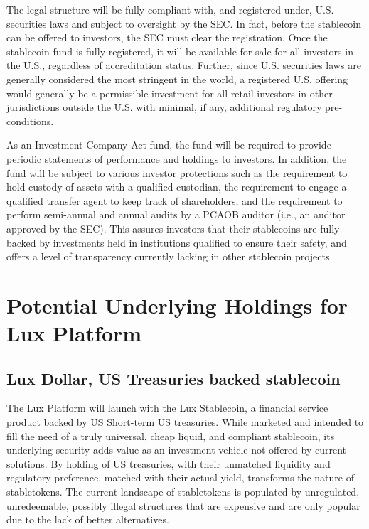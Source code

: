 \documentclass[11pt]{article}
\begin{document}
The legal structure will be fully compliant with, and registered under, U.S. securities laws and subject to oversight by the SEC.  In fact, before the stablecoin can be offered to investors, the SEC must clear the registration.  Once the stablecoin fund is fully registered, it will be available for sale for all investors in the U.S., regardless of accreditation status.  Further, since U.S. securities laws are generally considered the most stringent in the world, a registered U.S. offering would generally be a permissible investment for all retail investors in other jurisdictions outside the U.S. with minimal, if any, additional regulatory pre-conditions.


As an Investment Company Act fund, the fund will be required to provide periodic statements of performance and holdings to investors.  In addition, the fund will be subject to various investor protections such as the requirement to hold custody of assets with a qualified custodian, the requirement to engage a qualified transfer agent to keep track of shareholders, and the requirement to perform semi-annual and annual audits by a PCAOB auditor (i.e., an auditor approved by the SEC).  This assures investors that their stablecoins are fully-backed by investments held in institutions qualified to ensure their safety, and offers a level of transparency currently lacking in other stablecoin projects.


\section{Potential Underlying Holdings for Lux Platform}

\subsection{Lux Dollar, US Treasuries backed stablecoin}

The Lux Platform will launch with the Lux Stablecoin, a financial service product backed by US Short-term US treasuries. While marketed and intended to fill the need of a truly universal, cheap liquid, and compliant stablecoin, its underlying security adds value as an investment vehicle not offered by current solutions. By holding of US treasuries, with their unmatched liquidity and regulatory preference, matched with their actual yield, transforms the nature of stabletokens. The current landscape of stabletokens is populated by unregulated, unredeemable, possibly illegal structures that are expensive and are only popular due to the lack of better alternatives.
\end{document}
